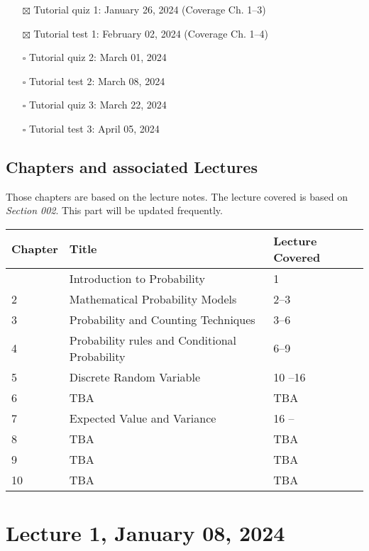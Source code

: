 \documentclass[
]{book}
\providecommand{\tightlist}{%
  \setlength{\itemsep}{0pt}\setlength{\parskip}{0pt}}
\theoremstyle{definition}
\theoremstyle{definition}
\theoremstyle{definition}
\theoremstyle{definition}
\theoremstyle{remark}
\begin{document}
\begin{itemize}
\tightlist
\item[$\boxtimes$]
  Tutorial quiz 1: January 26, 2024 (Coverage Ch. 1--3)
\item[$\boxtimes$]
  Tutorial test 1: February 02, 2024 (Coverage Ch. 1--4)
\item[$\square$]
  Tutorial quiz 2: March 01, 2024
\item[$\square$]
  Tutorial test 2: March 08, 2024
\item[$\square$]
  Tutorial quiz 3: March 22, 2024
\item[$\square$]
  Tutorial test 3: April 05, 2024
\end{itemize}

\hypertarget{chapters-and-associated-lectures}{%
\section{Chapters and associated Lectures}\label{chapters-and-associated-lectures}}

Those chapters are based on the lecture notes. The lecture covered is based on \emph{Section 002}. This part will be updated frequently.

\begin{longtable}[]{@{}lll@{}}
\toprule\noalign{}
Chapter & Title & Lecture Covered \\
\midrule\noalign{}
\endhead
\bottomrule\noalign{}
\endlastfoot
1 & Introduction to Probability & 1 \\
2 & Mathematical Probability Models & 2--3 \\
3 & Probability and Counting Techniques & 3--6 \\
4 & Probability rules and Conditional Probability & 6--9 \\
5 & Discrete Random Variable & 10 --16 \\
6 & TBA & TBA \\
7 & Expected Value and Variance & 16 -- \\
8 & TBA & TBA \\
9 & TBA & TBA \\
10 & TBA & TBA \\
\end{longtable}

\hypertarget{lecture-1-january-08-2024}{%
\chapter{Lecture 1, January 08, 2024}\label{lecture-1-january-08-2024}}
\end{document}
